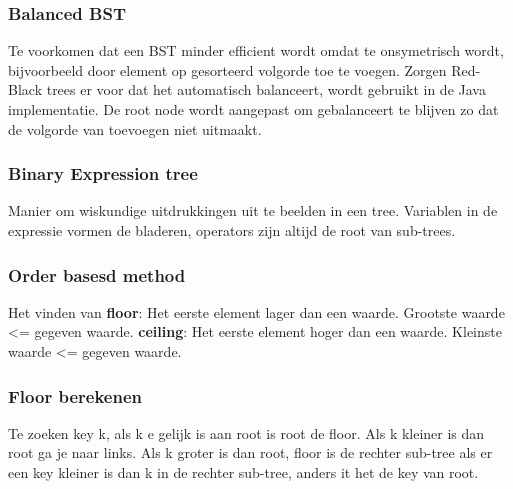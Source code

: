 \subsubsection{Balanced BST}
Te voorkomen dat een BST minder efficient wordt omdat te onsymetrisch wordt, bijvoorbeeld door element op gesorteerd volgorde toe te voegen.
Zorgen Red-Black trees er voor dat het automatisch balanceert, wordt gebruikt in de Java implementatie.
De root node wordt aangepast om gebalanceert te blijven zo dat de volgorde van toevoegen niet uitmaakt.

\subsubsection{Binary Expression tree}
Manier om wiskundige uitdrukkingen uit te beelden in een tree.
Variablen in de expressie vormen de bladeren, operators zijn altijd de root van sub-trees.

\subsubsection{Order basesd method}
Het vinden van 
\textbf{floor}: Het eerste element lager dan een waarde.
Grootste waarde <= gegeven waarde.
\textbf{ceiling}: Het eerste element hoger dan een waarde.
Kleinste waarde <= gegeven waarde.

\subsubsection{Floor berekenen}
Te zoeken key k, als k e gelijk is aan root is root de floor.
Als k kleiner is dan root ga je naar links.
Als k groter is dan root, floor is de rechter sub-tree als er een key kleiner is dan k in de rechter sub-tree, anders it het de key van root.

